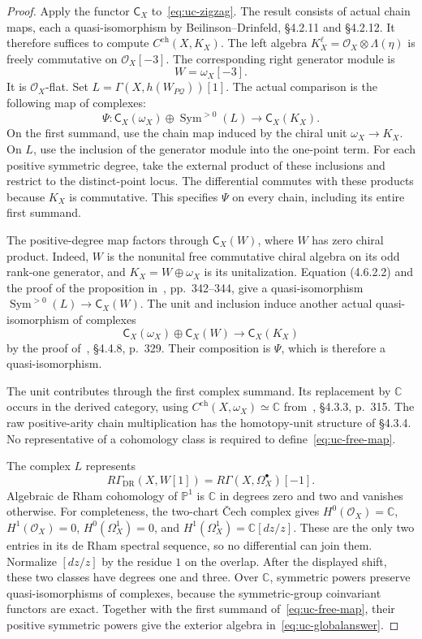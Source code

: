 \begin{proof}
Apply the functor $\mathsf C_X$ to~\eqref{eq:uc-zigzag}.
The result consists of actual chain maps, each a quasi-isomorphism by Beilinson--Drinfeld, \S4.2.11 and \S4.2.12.
It therefore suffices to compute $C^{\mathrm{ch}}(X,K_X)$.
The left algebra $K_X^\ell=\mathcal O_X\otimes\Lambda(\eta)$ is freely commutative on $\mathcal O_X[-3]$.
The corresponding right generator module is
\[
 W=\omega_X[-3].
\]
It is $\mathcal O_X$-flat.
Set $L=\Gamma(X,h(W_{P\mathcal Q}))[1]$.
The actual comparison is the following map of complexes:
\begin{equation}\label{eq:uc-free-map}
 \Psi:\mathsf C_X(\omega_X)\oplus\operatorname{Sym}^{>0}(L)
 \longrightarrow\mathsf C_X(K_X).
\end{equation}
On the first summand, use the chain map induced by the chiral unit $\omega_X\to K_X$.
On $L$, use the inclusion of the generator module into the one-point term.
For each positive symmetric degree, take the external product of these inclusions and restrict to the distinct-point locus.
The differential commutes with these products because $K_X$ is commutative.
This specifies $\Psi$ on every chain, including its entire first summand.

The positive-degree map factors through $\mathsf C_X(W)$, where $W$ has zero chiral product.
Indeed, $W$ is the nonunital free commutative chiral algebra on its odd rank-one generator, and $K_X=W\oplus\omega_X$ is its unitalization.
Equation (4.6.2.2) and the proof of the proposition in~\cite{BD026}, pp.~342--344, give a quasi-isomorphism
$\operatorname{Sym}^{>0}(L)\to\mathsf C_X(W)$.
The unit and inclusion induce another actual quasi-isomorphism of complexes
\[
 \mathsf C_X(\omega_X)\oplus\mathsf C_X(W)
 \longrightarrow\mathsf C_X(K_X)
\]
by the proof of~\cite{BD026}, \S4.4.8, p.~329.
Their composition is $\Psi$, which is therefore a quasi-isomorphism.

The unit contributes through the first complex summand.
Its replacement by $\mathbb C$ occurs in the derived category, using
$C^{\mathrm{ch}}(X,\omega_X)\simeq\mathbb C$ from~\cite{BD026}, \S4.3.3, p.~315.
The raw positive-arity chain multiplication has the homotopy-unit structure of \S4.3.4.
No representative of a cohomology class is required to define~\eqref{eq:uc-free-map}.

The complex $L$ represents
\[
 R\Gamma_{\mathrm{DR}}(X,W[1])
 =R\Gamma(X,\Omega_X^\bullet)[-1].
\]
Algebraic de Rham cohomology of $\mathbb P^1$ is $\mathbb C$ in degrees zero and two and vanishes otherwise.
For completeness, the two-chart \v Cech complex gives
$H^0(\mathcal O_X)=\mathbb C$, $H^1(\mathcal O_X)=0$,
$H^0(\Omega_X^1)=0$, and $H^1(\Omega_X^1)=\mathbb C[dz/z]$.
These are the only two entries in its de Rham spectral sequence, so no differential can join them.
Normalize $[dz/z]$ by the residue $1$ on the overlap.
After the displayed shift, these two classes have degrees one and three.
Over $\mathbb C$, symmetric powers preserve quasi-isomorphisms of complexes, because the symmetric-group coinvariant functors are exact.
Together with the first summand of~\eqref{eq:uc-free-map}, their positive symmetric powers give the exterior algebra in~\eqref{eq:uc-globalanswer}.


\end{proof}
